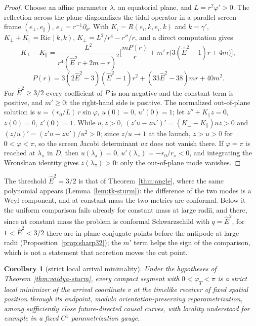 \documentclass[aip,jmp,amsmath,amssymb,reprint]{revtex4-2}
\newcommand{\Ehat}{\hat E}
\theoremstyle{plain}
\newtheorem{corollary}[proposition]{Corollary}
\theoremstyle{definition}
\begin{document}
\begin{proof}
Choose an affine parameter $\lambda$, an equatorial plane, and $L=r^2\varphi'>0$. The reflection
across the plane diagonalizes the tidal operator in a parallel screen frame
$(e_\perp,e_\parallel)$, $e_\perp=r^{-1}\partial_\theta$. With $K_i=R(e_i,k,e_i,k)$ and $k=\gamma'$,
$K_\perp+K_\parallel=\mathrm{Ric}(k,k)$, $K_\perp=L^2/r^4-r''/r$, and a direct computation gives
\[
  K_\perp-K_\parallel=\frac{L^2}{r^4(\Ehat^2r+2m-r)^2}
  \Big[\frac{mP(r)}{r}+m'\,r\big(3(\Ehat^2-1)r+4m\big)\Big],
\]
\[
  P(r)=3(2\Ehat^2-3)(\Ehat^2-1)r^2+(33\Ehat^2-38)mr+40m^2 .
\]
For $\Ehat^2\ge3/2$ every coefficient of $P$ is non-negative and the constant term is positive,
and $m'\ge0$: the right-hand side is positive. The normalized out-of-plane solution is
$u=(r_0/L)\,r\sin\varphi$, $u(0)=0$, $u'(0)=1$; let $z''+K_\parallel z=0$, $z(0)=0$, $z'(0)=1$. While
$u,z>0$, $(z'u-zu')'=(K_\perp-K_\parallel)uz>0$ and $(z/u)'=(z'u-zu')/u^2>0$; since $z/u\to1$ at the
launch, $z>u>0$ for $0<\varphi<\pi$, so the screen Jacobi determinant $uz$ does not vanish there.
If $\varphi=\pi$ is reached at $\lambda_\pi$ in $D$, then $u(\lambda_\pi)=0$, $u'(\lambda_\pi)=-r_0/r_\pi<0$, and
integrating the Wronskian identity gives $z(\lambda_\pi)>0$: only the out-of-plane mode vanishes.
\end{proof}

The threshold $\Ehat^2=3/2$ is that of Theorem~\ref{thm:angle}, where the same polynomial appears (Lemma~\ref{lem:tk-sturm}): the difference of the two modes is a Weyl component, and at constant mass the two metrics are conformal. Below it the
uniform comparison fails already for constant mass at large radii, and there, since at constant
mass the problem is conformal Schwarzschild with $q=\Ehat^2$, for $1<\Ehat^2<3/2$ there are in-plane conjugate
points before the antipode at large radii (Proposition~\ref{prop:sharp32}); the $m'$ term helps the sign of the comparison, which is not a
statement that accretion moves the cut point.

\begin{corollary}[strict local arrival minimality]\label{cor:vaidya-local-arrival}
Under the hypotheses of Theorem~\ref{thm:vaidya-sturm}, every compact segment with
$0<\varphi_T<\pi$ is a strict local minimizer of the arrival coordinate $v$ at the timelike receiver
of fixed spatial position through its endpoint, modulo orientation-preserving
reparametrization, among sufficiently close future-directed causal curves, with locality
understood for example in a fixed $C^1$ parametrization gauge.
\end{corollary}
\end{document}
